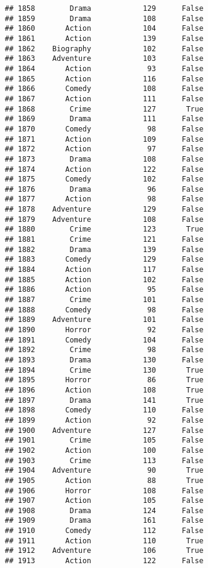 \documentclass[
]{article}
\begin{document}
\begin{verbatim}
## 1858        Drama            129      False
## 1859        Drama            108      False
## 1860       Action            104      False
## 1861       Action            139      False
## 1862    Biography            102      False
## 1863    Adventure            103      False
## 1864       Action             93      False
## 1865       Action            116      False
## 1866       Comedy            108      False
## 1867       Action            111      False
## 1868        Crime            127       True
## 1869        Drama            111      False
## 1870       Comedy             98      False
## 1871       Action            109      False
## 1872       Action             97      False
## 1873        Drama            108      False
## 1874       Action            122      False
## 1875       Comedy            102      False
## 1876        Drama             96      False
## 1877       Action             98      False
## 1878    Adventure            129      False
## 1879    Adventure            108      False
## 1880        Crime            123       True
## 1881        Crime            121      False
## 1882        Drama            139      False
## 1883       Comedy            129      False
## 1884       Action            117      False
## 1885       Action            102      False
## 1886       Action             95      False
## 1887        Crime            101      False
## 1888       Comedy             98      False
## 1889    Adventure            101      False
## 1890       Horror             92      False
## 1891       Comedy            104      False
## 1892        Crime             98      False
## 1893        Drama            130      False
## 1894        Crime            130       True
## 1895       Horror             86       True
## 1896       Action            108       True
## 1897        Drama            141       True
## 1898       Comedy            110      False
## 1899       Action             92      False
## 1900    Adventure            127      False
## 1901        Crime            105      False
## 1902       Action            100      False
## 1903        Crime            113      False
## 1904    Adventure             90       True
## 1905       Action             88       True
## 1906       Horror            108      False
## 1907       Action            105      False
## 1908        Drama            124      False
## 1909        Drama            161      False
## 1910       Comedy            112      False
## 1911       Action            110       True
## 1912    Adventure            106       True
## 1913       Action            122      False

\end{verbatim}
\end{document}
